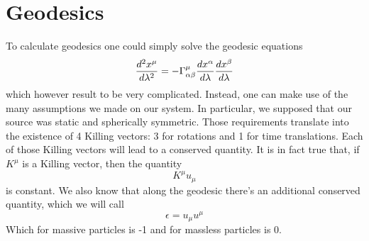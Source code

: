 \documentclass[]{article}
\theoremstyle{definition}
\theoremstyle{Theorem}
\theoremstyle{definition}
\theoremstyle{definition}
\theoremstyle{definition}
\begin{document}
\section{Geodesics}
To calculate geodesics one could simply solve the geodesic equations $${d^2x^\mu\over d\lambda^2}=-\Gamma_{\alpha\beta}^\mu{dx^\alpha\over d\lambda}{dx^\beta\over d\lambda}$$
which however result to be very complicated. Instead, one can make use of the many assumptions we made on our system. In particular, we supposed that our source was static and spherically symmetric. Those requirements translate into the existence of 4 Killing vectors: 3 for rotations and 1 for time translations. Each of those Killing vectors will lead to a conserved quantity. It is in fact true that, if $K^\mu$ is a Killing vector, then the quantity $$K^\mu u_\mu$$
is constant. We also know that along the geodesic there's an additional conserved quantity, which we will call
$$\epsilon=u_\mu u^\mu$$
Which for massive particles is -1 and for massless particles is 0.\\
\\
\end{document}
